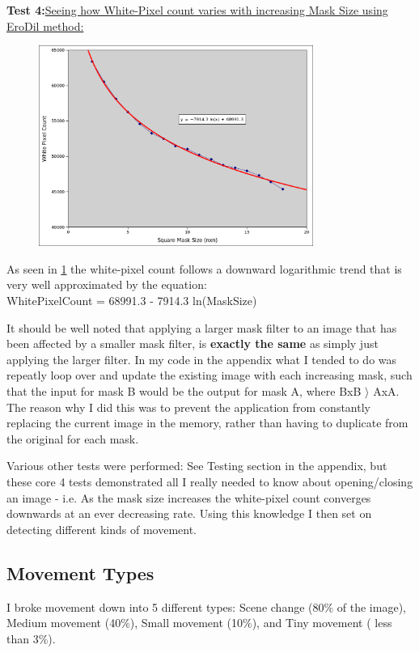 \documentclass[11pt]{article} %
\begin{document}
\pagebreak
{\hspace{-20pt} \bf Test 4:}{\underline {Seeing how White-Pixel count varies with increasing Mask Size using EroDil method:}}
\begin{figure}[H]
	\vspace{0pt}
	\begin{center}
		\includegraphics[width=0.8\textwidth]{../images/ImageOps/chartMask}
		\caption{}
		\label{img:maskChart}
	\end{center}
\end{figure}
As seen in \cref{img:maskChart} the white-pixel count follows a downward logarithmic trend that is very well approximated by the equation:\\
WhitePixelCount = 68991.3 - 7914.3 ln(MaskSize)

It should be well noted that applying a larger mask filter to an image that has been affected by a smaller mask filter, is {\bf exactly the same} as simply just applying the larger filter.  In my code in the appendix what I tended to do was repeatly loop over and update the existing image with each increasing mask, such that the input for mask B would be the output for mask A, where BxB \(\rangle\) AxA.  The reason why I did this was to prevent the application from constantly replacing the current image in the memory, rather than having to duplicate from the original for each mask.

Various other tests were performed: See Testing section in the appendix, but these core 4 tests demonstrated all I really needed to know about opening/closing an image - i.e. As the mask size increases the white-pixel count converges downwards at an ever decreasing rate. Using this knowledge I then set on detecting different kinds of movement.

\subsection{Movement Types}
I broke movement down into 5 different types:  Scene change (80\% of the image), Medium movement (40\%), Small movement (10\%), and Tiny movement ( less than 3\%).
\end{document}

